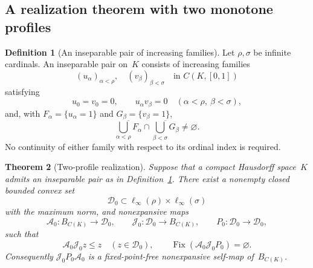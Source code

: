 \documentclass[preprint,12pt,nopreprintline]{elsarticle}
\newtheorem{theorem}{Theorem}[section]
\theoremstyle{definition}
\newtheorem{definition}[theorem]{Definition}
\theoremstyle{remark}
\numberwithin{equation}{section}
\begin{document}
\subsection{A realization theorem with two monotone profiles}
\label{tcp:subsec:two-profile-realization}

\begin{definition}[An inseparable pair of increasing families]
\label{tcp:def:inseparable-pair}
Let $\rho,\sigma$ be infinite cardinals. An inseparable pair on~$K$ consists of increasing families
\[
 (u_\alpha)_{\alpha<\rho},\quad
 (v_\beta)_{\beta<\sigma}\quad\text{in }C(K,[0,1])
\]
satisfying
\begin{equation}
 u_0=v_0=0,\qquad u_\alpha v_\beta=0
 \quad(\alpha<\rho,\ \beta<\sigma),
 \label{tcp:eq:orthogonal-families}
\end{equation}
and, with $F_\alpha=\{u_\alpha=1\}$ and
$G_\beta=\{v_\beta=1\}$,
\begin{equation}
 \overline{\bigcup_{\alpha<\rho}F_\alpha}
 \cap
 \overline{\bigcup_{\beta<\sigma}G_\beta}\ne\varnothing.
 \label{tcp:eq:terminal-intersection}
\end{equation}
No continuity of either family with respect to its ordinal index is required.
\end{definition}

\begin{theorem}[Two-profile realization]
\label{tcp:thm:two-profile-realization}
Suppose that a compact Hausdorff space~$K$ admits an inseparable pair as in Definition~\ref{tcp:def:inseparable-pair}. There exist a nonempty closed bounded convex set
\[
 \mathcal D_0\subset \ell_\infty(\rho)\times\ell_\infty(\sigma)
\]
with the maximum norm, and nonexpansive maps
\[
 \mathcal A_0:B_{C(K)}\to\mathcal D_0,
 \qquad
 \mathcal J_0:\mathcal D_0\to B_{C(K)},
 \qquad
 P_0:\mathcal D_0\to\mathcal D_0,
\]
such that
\[
 \mathcal A_0\mathcal J_0z\le z\quad(z\in\mathcal D_0),
 \qquad
 \operatorname{Fix}(\mathcal A_0\mathcal J_0P_0)=\varnothing.
\]
Consequently $\mathcal J_0P_0\mathcal A_0$ is a fixed-point-free nonexpansive self-map of~$B_{C(K)}$.
\end{theorem}
\end{document}
